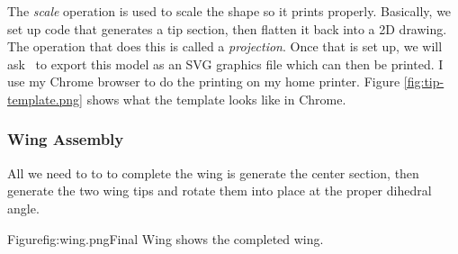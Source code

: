 
The {\it scale} operation is used to scale the shape so it prints properly.
Basically, we set up code that generates a tip section, then flatten it back
into a 2D drawing. The operation that does this is called a {\it projection}.
Once that is set up, we will ask \osc\ to export this model as an SVG graphics
file which can then be printed. I use my Chrome browser to do the printing on my
home printer.  Figure \ref{fig:tip-template.png} shows what the template looks
like in Chrome.


\subsubsection{Wing Assembly}

All we need to to to complete the wing is generate the center section, then
generate the two wing tips and rotate them into place at the proper dihedral angle.

Figure{fig:wing.png}{Final Wing} shows the completed wing.



